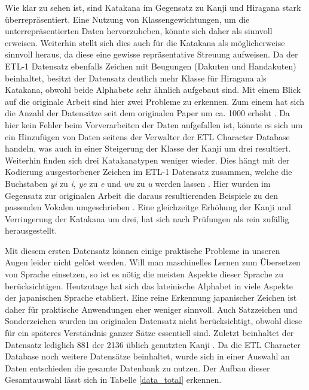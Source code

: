 \documentclass[twoside,a4paper]{IEEEtran}
\begin{document}
Wie klar zu sehen ist, sind Katakana im Gegensatz zu Kanji und Hiragana stark überrepräsentiert. Eine Nutzung von Klassengewichtungen, um die unterrepräsentierten Daten hervorzuheben, könnte sich daher als sinnvoll erweisen. Weiterhin stellt sich dies auch für die Katakana als möglicherweise sinnvoll heraus, da diese eine gewisse repräsentative Streuung aufweisen. Da der ETL-1 Datensatz ebenfalls Zeichen mit Beugungen (Dakuten und Handakuten) beinhaltet, besitzt der Datensatz deutlich mehr Klasse für Hiragana als Katakana, obwohl beide Alphabete sehr ähnlich aufgebaut sind. Mit einem Blick auf die originale Arbeit sind hier zwei Probleme zu erkennen. Zum einem hat sich die Anzahl der Datensätze seit dem originalen Paper um ca. 1000 erhöht \cite[S.3]{RHC}. Da hier kein Fehler beim Vorverarbeiten der Daten aufgefallen ist, könnte es sich um ein Hinzufügen von Daten seitens der Verwalter der ETL Character Database handeln, was auch in einer Steigerung der Klasse der Kanji um drei resultiert. Weiterhin finden sich drei Katakanatypen weniger wieder. Dies hängt mit der Kodierung ausgestorbener Zeichen im ETL-1 Datensatz zusammen, welche die Buchstaben \textit{yi} zu \textit{i}, \textit{ye} zu \textit{e} und \textit{wu} zu \textit{u} werden lassen \cite{ETL}. Hier wurden im Gegensatz zur originalen Arbeit die daraus resultierenden Beispiele zu den passenden Vokalen umgeschrieben \cite[S.3]{RHC}. Eine gleichzeitge Erhöhung der Kanji und Verringerung der Katakana um drei, hat sich nach Prüfungen als rein zufällig herausgestellt. 

Mit diesem ersten Datensatz können einige praktische Probleme in unseren Augen leider nicht gelöst werden. Will man maschinelles Lernen zum Übersetzen von Sprache einsetzen, so ist es nötig die meisten Aspekte dieser Sprache zu berücksichtigen. Heutzutage hat sich das lateinische Alphabet in viele Aspekte der japanischen Sprache etabliert. Eine reine Erkennung japanischer Zeichen ist daher für praktische Anwendungen eher weniger sinnvoll. Auch Satzzeichen und Sonderzeichen wurden im originalen Datensatz nicht berücksichtigt, obwohl diese für ein späteres Verständnis ganzer Sätze essentiell sind. Zuletzt beinhaltet der Datensatz lediglich 881 der 2136 üblich genutzten Kanji \cite[S.3]{RHC}. Da die ETL Character Database noch weitere Datensätze beinhaltet, wurde sich in einer Auswahl an Daten entschieden die gesamte Datenbank zu nutzen. Der Aufbau dieser Gesamtauswahl lässt sich in Tabelle \ref{data_total} erkennen.
\end{document}
